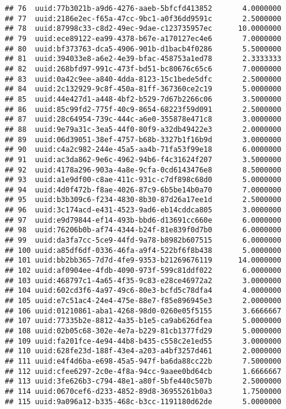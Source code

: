 \documentclass[
]{article}
\begin{document}
\begin{verbatim}
## 76  uuid:77b3021b-a9d6-4276-aaeb-5bfcfd413852       4.0000000
## 77  uuid:2186e2ec-f65a-47cc-9bc1-a0f36dd9591c       2.5000000
## 78  uuid:87998c33-c8d2-49ec-9dae-c123735957ec      10.0000000
## 79  uuid:ece89122-ea99-4378-b67e-a170127ec4e6       7.0000000
## 80  uuid:bf373763-dca5-4906-901b-d1bacb4f0286       5.5000000
## 81  uuid:394033e8-a6e2-4e39-bfac-458753a1ed78       2.3333333
## 82  uuid:268bfd97-991c-473f-bd51-bc80676c65c6       7.0000000
## 83  uuid:0a42c9ee-a840-4dda-8123-15c1bede5dfc       2.5000000
## 84  uuid:2c132929-9c8f-450a-81ff-367360ce2c19       5.0000000
## 85  uuid:44e427d1-a448-4bf2-b529-7d67b2266c06       3.5000000
## 86  uuid:85c99fd2-775f-40c9-8654-68223f59d091       2.5000000
## 87  uuid:28c64954-739c-444c-a6e0-355878e471c8       3.0000000
## 88  uuid:9e79a31c-3ea5-44f0-80f9-a32db49422e3       2.0000000
## 89  uuid:06d39051-38ef-4757-b68b-3327b1f16b9d       3.0000000
## 90  uuid:c4a2c982-244e-45a5-aa4b-71fa53f99e18       6.0000000
## 91  uuid:ac3da862-9e6c-4962-94b6-f4c31624f207       3.5000000
## 92  uuid:4178a296-903a-4a8e-9cfa-0cd6143476e8       8.5000000
## 93  uuid:a1e9df00-c8ae-411c-931c-c7df898c68d0       5.0000000
## 94  uuid:4d0f472b-f8ae-4026-87c9-6b5be14b0a70       7.0000000
## 95  uuid:b3b309c6-f234-4830-8b30-87d26a17ee1d       2.5000000
## 96  uuid:3c174acd-e431-4523-9ad6-eb14cddca805       3.0000000
## 97  uuid:e9d79844-ef14-493b-bbd6-d13691cc660e       6.0000000
## 98  uuid:76206b0b-af74-4344-b24f-81e839f0d7b0       6.0000000
## 99  uuid:da3fa7cc-5ce9-44fd-9a78-b8982b607515       6.0000000
## 100 uuid:a85df6df-0336-46fa-a9f4-522bf6f8b438       5.0000000
## 101 uuid:bb2bb365-7d7d-4fe9-9353-b21269676119      14.0000000
## 102 uuid:af0904ee-4fdb-4090-973f-599c81ddf022       6.0000000
## 103 uuid:468797c1-4a65-4f35-9c83-e28ce46972a2       3.0000000
## 104 uuid:602cd3f6-4a97-49c6-80e3-bcfd5c78dfa4       4.0000000
## 105 uuid:e7c51ac4-24e4-475e-88e7-f85e896945e3       2.0000000
## 106 uuid:01210861-aba1-4268-98d0-0260e05f5155       3.6666667
## 107 uuid:77335b2e-8812-4a35-b1e5-ca9ab626dfea       5.0000000
## 108 uuid:02b05c68-302e-4e7a-b229-81cb1377fd29       5.0000000
## 109 uuid:fa201fce-4e94-44b8-b435-c558c2e1ed55       3.0000000
## 110 uuid:628fe23d-188f-43e4-a203-a4bf3257d461       2.0000000
## 111 uuid:e4f4d6ba-e698-45a5-947f-ba6da88cc22b       7.5000000
## 112 uuid:cfee6297-2c0e-4f8a-94cc-9aaee0bd64cb       1.6666667
## 113 uuid:3fe626b3-c794-48e1-a80f-5bfe440c507b       2.5000000
## 114 uuid:0670cef6-d233-4852-89d8-36955261b0a3       1.7500000
## 115 uuid:9a096a12-b335-468c-b3cc-1191180d62de       5.0000000

\end{verbatim}
\end{document}
